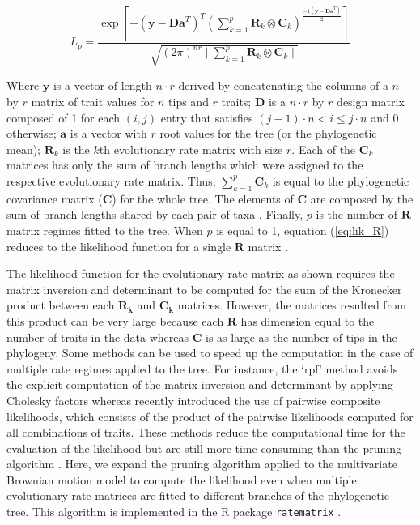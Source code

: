 \begin{equation} \label{eq:lik_R}
L_{p} = \frac{\exp [-(\mathbf{y}-\mathbf{Da}^{T})^{T} (\sum\limits_{k=1}^{p} \mathbf{R}_{k} \otimes \mathbf{C}_{k})^ \frac{-1 (\mathbf{y}-\mathbf{Da}^{T})}{2}]}{\sqrt{(2\pi)^{nr} \mid \sum\limits_{k=1}^{p} \mathbf{R}_{k} \otimes \mathbf{C}_{k} \mid}}
\end{equation}

Where $\mathbf{y}$ is a vector of length $n \cdot r$ derived by concatenating the columns of a $n$ by $r$ matrix of trait values for $n$ tips and $r$ traits; $\mathbf{D}$ is a $n \cdot r$ by $r$ design matrix composed of 1 for each $(i,j)$ entry that satisfies $(j-1) \cdot n < i \leq j \cdot n$ and 0 otherwise; $\mathbf{a}$ is a vector with $r$ root values for the tree (or the phylogenetic mean); $\mathbf{R}_{k}$ is the $k$th evolutionary rate matrix with size $r$. Each of the $\mathbf{C}_{k}$ matrices has only the sum of branch lengths which were assigned to the respective evolutionary rate matrix. Thus, $\sum\limits_{k=1}^{p} \mathbf{C}_{k}$ is equal to the phylogenetic covariance matrix ($\mathbf{C}$) for the whole tree. The elements of $\mathbf{C}$ are composed by the sum of branch lengths shared by each pair of taxa \citep{felsenstein_1973}. Finally, $p$ is the number of $\mathbf{R}$ matrix regimes fitted to the tree. When $p$ is equal to 1, equation (\ref{eq:lik_R}) reduces to the likelihood function for a single $\mathbf{R}$ matrix \citep{revell_testing_2008}.

The likelihood function for the evolutionary rate matrix as shown requires the matrix inversion and determinant to be computed for the sum of the Kronecker product between each $\mathbf{R_{k}}$ and $\mathbf{C_{k}}$ matrices. However, the matrices resulted from this product can be very large because each $\mathbf{R}$ has dimension equal to the number of traits in the data whereas $\mathbf{C}$ is as large as the number of tips in the phylogeny. Some methods can be used to speed up the computation in the case of multiple rate regimes applied to the tree. For instance, the `rpf' method avoids the explicit computation of the matrix inversion and determinant by applying Cholesky factors \citep{Gustavson_rpf, Clavel_mvmorph} whereas \citet{goolsby_pseudolik_2016} recently introduced the use of pairwise composite likelihoods, which consists of the product of the pairwise likelihoods computed for all combinations of traits. These methods reduce the computational time for the evaluation of the likelihood but are still more time consuming than the pruning algorithm \citep{felsenstein_1973, freckleton_fast_2012, caetano_ratematrix_2017}. Here, we expand the pruning algorithm applied to the multivariate Brownian motion model \citep{felsenstein_1973, freckleton_fast_2012} to compute the likelihood even when multiple evolutionary rate matrices are fitted to different branches of the phylogenetic tree. This algorithm is implemented in the R package \texttt{ratematrix} \citep{caetano_ratematrix_2017}.

